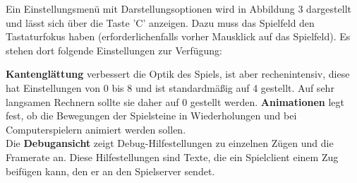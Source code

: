 \documentclass[a4paper, ngerman]{scrartcl}
\begin{document}
	Ein Einstellungsmenü mit Darstellungsoptionen wird in Abbildung 3 dargestellt
	und lässt sich über die Taste 'C' anzeigen. Dazu muss das
Spielfeld den Tastaturfokus haben (erforderlichenfalls
vorher Mausklick auf das Spielfeld). Es stehen dort
folgende Einstellungen zur Verfügung: 

\textbf{Kantenglättung} verbessert die Optik des
Spiels, ist aber rechenintensiv, diese hat Einstellungen von 0 bis 8 und ist
standardmäßig auf 4 gestellt.
Auf sehr langsamen Rechnern sollte sie daher auf 0 gestellt werden.
\textbf{Animationen} legt fest, ob die Bewegungen der Spielsteine in
Wiederholungen und bei Computerspielern animiert werden sollen.\\
Die \textbf{Debugansicht} zeigt Debug-Hilfestellungen zu einzelnen Zügen und
die Framerate an.
Diese Hilfestellungen sind Texte, die ein Spielclient einem Zug beifügen kann, den er
an den Spielserver sendet.
	
\end{document}
